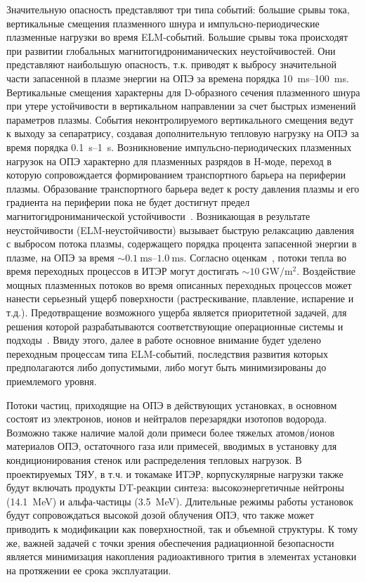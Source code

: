 Значительную опасность представляют три типа событий: большие срывы тока, вертикальные смещения плазменного шнура и импульсно-периодические плазменные нагрузки во время ELM-событий. Большие срывы тока происходят при развитии глобальных магнитогидрониманических неустойчивостей. Они представляют наибольшую опасность, т.к. приводят к выбросу значительной части запасенной в плазме энергии на ОПЭ за времена порядка \SIrange{10}{100}{\milli\second}. Вертикальные смещения характерны для D-образного сечения плазменного шнура при утере устойчивости в вертикальном направлении за счет быстрых изменений параметров плазмы. События неконтролируемого вертикального смещения ведут к выходу за сепаратрису, создавая дополнительную тепловую нагрузку на ОПЭ за время порядка \SIrange{0.1}{1}{\second}. Возникновение импульсно-периодических плазменных нагрузок на ОПЭ характерно для плазменных разрядов в H-моде, переход в которую сопровождается формированием транспортного барьера на периферии плазмы. Образование транспортного барьера ведет к росту давления плазмы и его градиента на периферии пока не будет достигнут предел магнитогидрониманической устойчивости~\cite{Leonard2014}. Возникающая в результате неустойчивости (ELM-неустойчивости) вызывает быструю релаксацию давления с выбросом потока плазмы, содержащего порядка процента запасенной энергии в плазме, на ОПЭ за время \( \sim\SIrange{0.1}{1.0}{\milli\second} \). Согласно оценкам~\cite{Loarte2003, hender2007mhd, Pitts2017, Pitts2019}, потоки тепла во время переходных процессов в ИТЭР могут достигать $\sim\SI{10}{\giga\watt\per\meter\squared}$. Воздействие мощных плазменных потоков во время описанных переходных процессов может нанести серьезный ущерб поверхности (растрескивание, плавление, испарение и т.д.). Предотвращение возможного ущерба является приоритетной задачей, для решения которой разрабатываются соответствующие операционные системы и подходы~\cite{Lang2013,Evans2013,Lehnen2015}. Ввиду этого, далее в работе основное внимание будет уделено переходным процессам типа ELM-событий, последствия развития которых предполагаются либо допустимыми, либо могут быть минимизированы до приемлемого уровня.

Потоки частиц, приходящие на ОПЭ в действующих установках, в основном состоят из электронов, ионов и нейтралов перезарядки изотопов водорода. Возможно также наличие малой доли примеси более тяжелых атомов/ионов материалов ОПЭ, остаточного газа или примесей, вводимых в установку для кондиционирования стенок или распределения тепловых нагрузок. В проектируемых ТЯУ, в т.ч. и токамаке ИТЭР, корпускулярные нагрузки также будут включать продукты DT-реакции синтеза: высокоэнергетичные нейтроны (\SI{14.1}{\mega\electronvolt}) и альфа-частицы (\SI{3.5}{\mega\electronvolt}). Длительные режимы работы установок будут сопровождаться высокой дозой облучения ОПЭ, что также может приводить к модификации как поверхностной, так и объемной структуры. К тому же, важней задачей с точки зрения обеспечения радиационной безопасности является минимизация накопления радиоактивного трития в элементах установки на протяжении ее срока эксплуатации.

